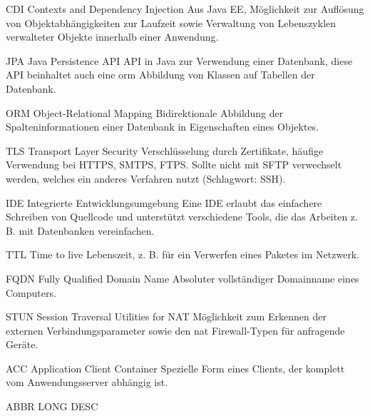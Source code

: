 
{CDI}            %
{Contexts and Dependency Injection}  %
{Aus Java EE, Möglichkeit zur Auflösung von Objektabhängigkeiten zur Laufzeit sowie Verwaltung von Lebenszyklen verwalteter Objekte innerhalb einer Anwendung.} %

{JPA}            %
{Java Persistence API}  %
{API in Java zur Verwendung einer Datenbank, diese API beinhaltet auch eine \acrshort{orm} Abbildung von Klassen auf Tabellen der Datenbank.} %
 
{ORM}            %
{Object-Relational Mapping}  %
{Bidirektionale Abbildung der Spalteninformationen einer Datenbank in Eigenschaften eines Objektes.} %

{TLS}            %
{Transport Layer Security}  %
{Verschlüsselung durch Zertifikate, häufige Verwendung bei HTTPS, SMTPS, FTPS. Sollte nicht mit SFTP verwechselt werden, welches ein anderes Verfahren nutzt (Schlagwort: SSH).} %
 

{IDE}            %
{Integrierte Entwicklungsumgebung}  %
{Eine IDE erlaubt das einfachere Schreiben von Quellcode und unterstützt verschiedene Tools, die das Arbeiten z. B. mit Datenbanken vereinfachen.} %




{TTL}            %
{Time to live}  %
{Lebenszeit, z. B. für ein Verwerfen eines Paketes im Netzwerk.} %


 
{FQDN}            %
{Fully Qualified Domain Name}  %
{Absoluter vollständiger Domainname eines Computers.} %
  
 
 
 
 {STUN}            %
 {Session Traversal Utilities for NAT}  %
 {Möglichkeit zum Erkennen der externen Verbindungsparameter sowie den \acrshort{nat} Firewall-Typen für anfragende Geräte.} %
 
  
 
 {ACC}            %
 {Application Client Container}  %
 {Spezielle Form eines Clients, der komplett vom Anwendungsserver abhängig ist.} %
 
 {ABBR}            %
 {LONG}  %
 {DESC} %
 
 
 
 